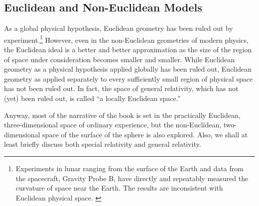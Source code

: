 \subsection{Euclidean and Non-Euclidean Models}

As a global physical hypothesis, Euclidean geometry has been ruled out by
experiment.\footnote{%
   Experiments in lunar ranging from the surface of the Earth and data from the
   spacecraft, Gravity Probe B, have directly and repeatably measured the
   curvature of space near the Earth. The results are inconsistent with
   Euclidean physical space.  \citep{gpb-2011, miller-geodetic}
}
However, even in the non-Euclidean geometries of modern physics, the Euclidean
ideal is a better and better approximation as the size of the region of space
under consideration becomes smaller and smaller.  While Euclidean geometry as a
physical hypothesis applied globally has been ruled out, Euclidean geometry as
applied separately to every sufficiently small region of physical space has not
been ruled out.  In fact, the space of general relativity, which has not (yet)
been ruled out, is called ``a locally Euclidean space.''

Anyway, most of the narrative of the book is set in the practically Euclidean,
three-dimensional space of ordinary experience, but the non-Euclidean,
two-dimensional space of the surface of the sphere is also explored.  Also, we
shall at least briefly discuss both special relativity and general relativity.

